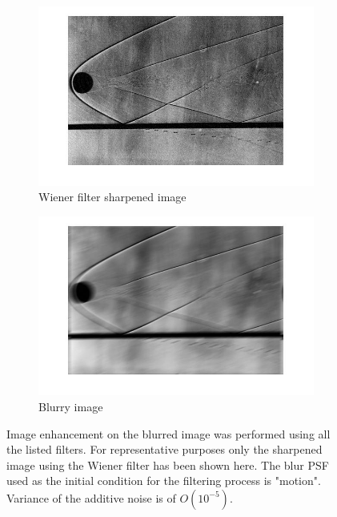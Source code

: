 \begin{figure}
        \centering
        \begin{subfigure}[b]{0.4\textwidth}
                \centering
                \includegraphics[width=\textwidth]{ssphere_wiener.jpg}
                \caption{Wiener filter sharpened image}
               
        \end{subfigure}
        \begin{subfigure}[b]{0.4\textwidth}
                \centering
                \includegraphics[width=\textwidth]{ssphere_motion.jpg}
                \caption{Blurry image} 
        \end{subfigure} 
       
        \caption{Image enhancement on the blurred image was performed using all the listed filters. For representative purposes only the sharpened image using the Wiener filter has been shown here. The blur PSF used as the initial condition for the filtering process is "motion". Variance of the additive noise is of $O(10^{-5})$. } \label{fig:sphere}
\end{figure}

